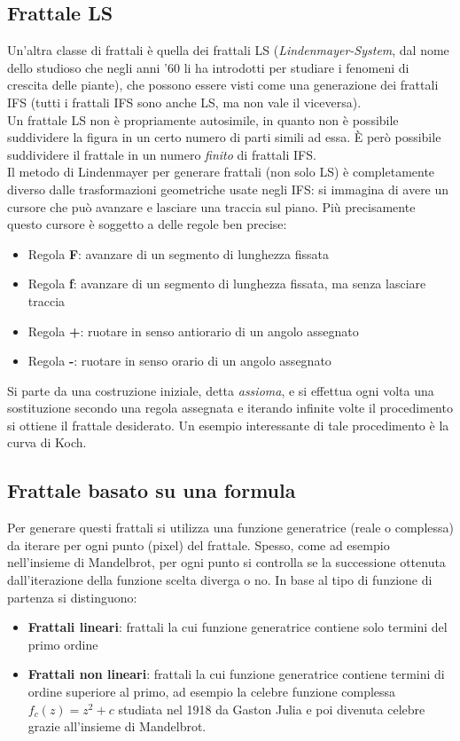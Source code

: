 \documentclass[10pt]{report}
\begin{document}
			\subsection{Frattale LS}
				Un'altra classe di frattali è quella dei frattali LS (\textit{Lindenmayer-System}, dal nome dello studioso che negli anni '60 li ha introdotti per studiare i fenomeni di crescita delle piante), che possono essere visti come una generazione dei frattali IFS (tutti i frattali IFS sono anche LS, ma non vale il viceversa).\\
				Un frattale LS non è propriamente autosimile, in quanto non è possibile suddividere la figura in un certo numero di parti simili ad essa. \`E però possibile suddividere il frattale in un numero \emph{finito} di frattali IFS.\\
				Il metodo di Lindenmayer per generare frattali (non solo LS) è completamente diverso dalle trasformazioni geometriche usate negli IFS: si immagina di avere un cursore che può avanzare e lasciare una traccia sul piano. Più precisamente questo cursore è soggetto a delle regole ben precise:
				\begin{itemize}
					\item Regola \textbf{F}: avanzare di un segmento di lunghezza fissata
					\item Regola \textbf{f}: avanzare di un segmento di lunghezza fissata, ma senza lasciare traccia
					\item Regola \textbf{+}: ruotare in senso antiorario di un angolo assegnato
					\item Regola \textbf{-}: ruotare in senso orario di un angolo assegnato
				\end{itemize}
				Si parte da una costruzione iniziale, detta \textit{assioma}, e si effettua ogni volta una sostituzione secondo una regola assegnata e iterando infinite volte il procedimento si ottiene il frattale desiderato. Un esempio interessante di tale procedimento è la curva di Koch.
			\subsection{Frattale basato su una formula}
				Per generare questi frattali si utilizza una funzione generatrice (reale o complessa) da iterare per ogni punto (pixel) del frattale. Spesso, come ad esempio nell'insieme di Mandelbrot, per ogni punto si controlla se la successione ottenuta dall'iterazione della funzione scelta diverga o no. In base al tipo di funzione di partenza si distinguono:
				\begin{itemize}
					\item \textbf{Frattali lineari}: frattali la cui funzione generatrice contiene solo termini del primo ordine
					\item \textbf{Frattali non lineari}: frattali la cui funzione generatrice contiene termini di ordine superiore al primo, ad esempio la celebre funzione complessa $f_c(z) = z^2 + c$ studiata nel 1918 da Gaston Julia e poi divenuta celebre grazie all'insieme di Mandelbrot.
				\end{itemize}
\end{document}

